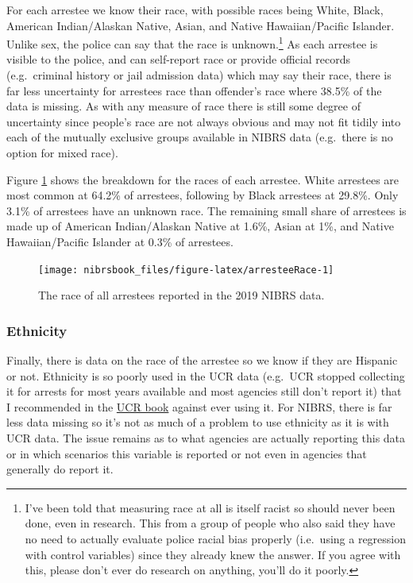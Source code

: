 \documentclass[
  12pt,
  openany]{book}
\begin{document}
For each arrestee we know their race, with possible races being White, Black, American Indian/Alaskan Native, Asian, and Native Hawaiian/Pacific Islander. Unlike sex, the police can say that the race is unknown.\footnote{I've been told that measuring race at all is itself racist so should never been done, even in research. This from a group of people who also said they have no need to actually evaluate police racial bias properly (i.e.~using a regression with control variables) since they already knew the answer. If you agree with this, please don't ever do research on anything, you'll do it poorly.} As each arrestee is visible to the police, and can self-report race or provide official records (e.g.~criminal history or jail admission data) which may say their race, there is far less uncertainty for arrestees race than offender's race where 38.5\% of the data is missing. As with any measure of race there is still some degree of uncertainty since people's race are not always obvious and may not fit tidily into each of the mutually exclusive groups available in NIBRS data (e.g.~there is no option for mixed race).

Figure \ref{fig:arresteeRace} shows the breakdown for the races of each arrestee. White arrestees are most common at 64.2\% of arrestees, following by Black arrestees at 29.8\%. Only 3.1\% of arrestees have an unknown race. The remaining small share of arrestees is made up of American Indian/Alaskan Native at 1.6\%, Asian at 1\%, and Native Hawaiian/Pacific Islander at 0.3\% of arrestees.

\begin{figure}

{\centering \texttt{[image: nibrsbook\_files/figure-latex/arresteeRace-1]} 

}

\caption{The race of all arrestees reported in the 2019 NIBRS data.}\label{fig:arresteeRace}
\end{figure}

\hypertarget{ethnicity-1}{%
\subsubsection{Ethnicity}\label{ethnicity-1}}

Finally, there is data on the race of the arrestee so we know if they are Hispanic or not. Ethnicity is so poorly used in the UCR data (e.g.~UCR stopped collecting it for arrests for most years available and most agencies still don't report it) that I recommended in the \href{https://ucrbook.com/}{UCR book} against ever using it. For NIBRS, there is far less data missing so it's not as much of a problem to use ethnicity as it is with UCR data. The issue remains as to what agencies are actually reporting this data or in which scenarios this variable is reported or not even in agencies that generally do report it.
\end{document}
